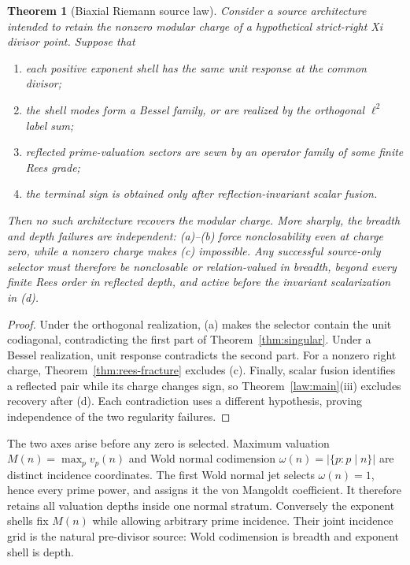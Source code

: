 \documentclass[11pt]{article}
\newtheorem{theorem}{Theorem}[section]
\theoremstyle{definition}
\theoremstyle{remark}
\begin{document}
\begin{theorem}[Biaxial Riemann source law]\label{thm:frontier}
Consider a source architecture intended to retain the nonzero modular charge of a hypothetical
strict-right Xi divisor point.  Suppose that
\begin{enumerate}[label=\textup{(\alph*)}]
\item each positive exponent shell has the same unit response at the common divisor;
\item the shell modes form a Bessel family, or are realized by the orthogonal $\ell^2$ label sum;
\item reflected prime-valuation sectors are sewn by an operator family of some finite Rees grade;
\item the terminal sign is obtained only after reflection-invariant scalar fusion.
\end{enumerate}
Then no such architecture recovers the modular charge.  More sharply, the breadth and depth
failures are independent: \textup{(a)--(b)} force nonclosability even at charge zero, while a
nonzero charge makes \textup{(c)} impossible.  Any successful source-only selector must therefore
be nonclosable or relation-valued in breadth, beyond every finite Rees order in reflected depth,
and active before the invariant scalarization in \textup{(d)}.
\end{theorem}

\begin{proof}
Under the orthogonal realization, (a) makes the selector contain the unit codiagonal, contradicting
the first part of Theorem~\ref{thm:singular}.  Under a Bessel realization, unit response contradicts
the second part.  For a nonzero right charge, Theorem~\ref{thm:rees-fracture} excludes (c).
Finally, scalar fusion identifies a reflected pair while its charge changes sign, so
Theorem~\ref{law:main}(iii) excludes recovery after (d).  Each contradiction uses a different
hypothesis, proving independence of the two regularity failures.
\end{proof}

The two axes arise before any zero is selected.  Maximum valuation
$M(n)=\max_pv_p(n)$ and Wold normal codimension
$\omega(n)=|\{p:p\mid n\}|$ are distinct incidence coordinates.  The first Wold normal jet
selects $\omega(n)=1$, hence every prime power, and assigns it the von Mangoldt coefficient.
It therefore retains all valuation depths inside one normal stratum.  Conversely the exponent
shells fix $M(n)$ while allowing arbitrary prime incidence.  Their joint incidence grid is the
natural pre-divisor source: Wold codimension is breadth and exponent shell is depth.
\end{document}
